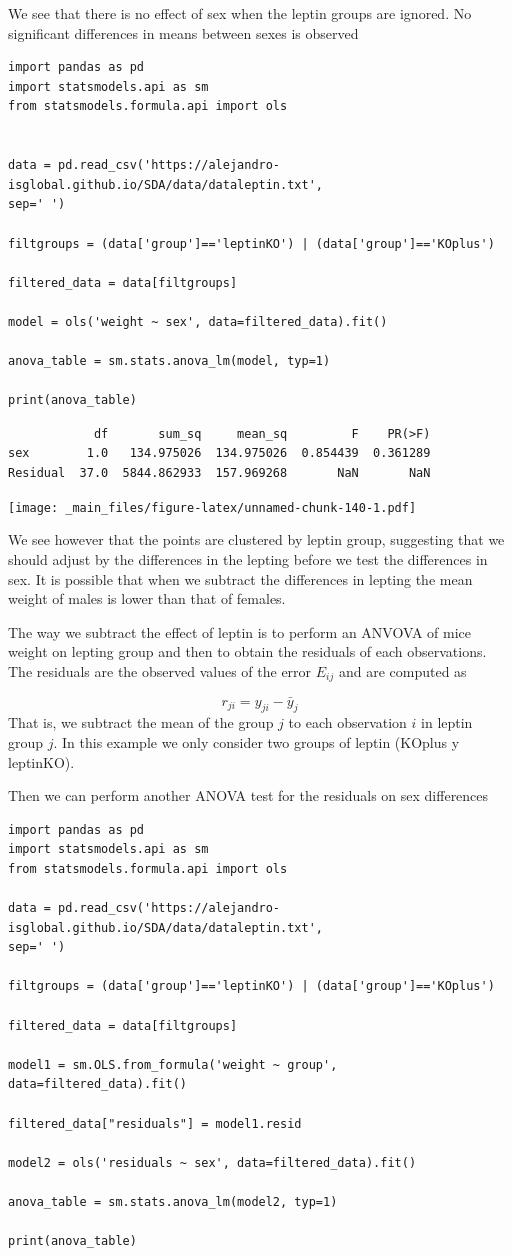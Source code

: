 \documentclass[
]{book}
\begin{document}
We see that there is no effect of sex when the leptin groups are ignored. No significant differences in means between sexes is observed

\begin{verbatim}
import pandas as pd
import statsmodels.api as sm
from statsmodels.formula.api import ols


data = pd.read_csv('https://alejandro-isglobal.github.io/SDA/data/dataleptin.txt', 
sep=' ')

filtgroups = (data['group']=='leptinKO') | (data['group']=='KOplus')

filtered_data = data[filtgroups]

model = ols('weight ~ sex', data=filtered_data).fit()

anova_table = sm.stats.anova_lm(model, typ=1)

print(anova_table)
\end{verbatim}

\begin{verbatim}
            df       sum_sq     mean_sq         F    PR(>F)
sex        1.0   134.975026  134.975026  0.854439  0.361289
Residual  37.0  5844.862933  157.969268       NaN       NaN
\end{verbatim}

\texttt{[image: \_main\_files/figure-latex/unnamed-chunk-140-1.pdf]}

We see however that the points are clustered by leptin group, suggesting that we should adjust by the differences in the lepting before we test the differences in sex. It is possible that when we subtract the differences in lepting the mean weight of males is lower than that of females.

The way we subtract the effect of leptin is to perform an ANVOVA of mice weight on lepting group and then to obtain the residuals of each observations. The residuals are the observed values of the error \(E_{ij}\) and are computed as

\[r_{ji}=y_{ji}-\bar{y}_j\]
That is, we subtract the mean of the group \(j\) to each observation \(i\) in leptin group \(j\). In this example we only consider two groups of leptin (KOplus y leptinKO).

Then we can perform another ANOVA test for the residuals on sex differences

\begin{verbatim}
import pandas as pd
import statsmodels.api as sm
from statsmodels.formula.api import ols

data = pd.read_csv('https://alejandro-isglobal.github.io/SDA/data/dataleptin.txt', 
sep=' ')

filtgroups = (data['group']=='leptinKO') | (data['group']=='KOplus')

filtered_data = data[filtgroups]

model1 = sm.OLS.from_formula('weight ~ group', data=filtered_data).fit()

filtered_data["residuals"] = model1.resid

model2 = ols('residuals ~ sex', data=filtered_data).fit()

anova_table = sm.stats.anova_lm(model2, typ=1)

print(anova_table)
\end{verbatim}
\end{document}
